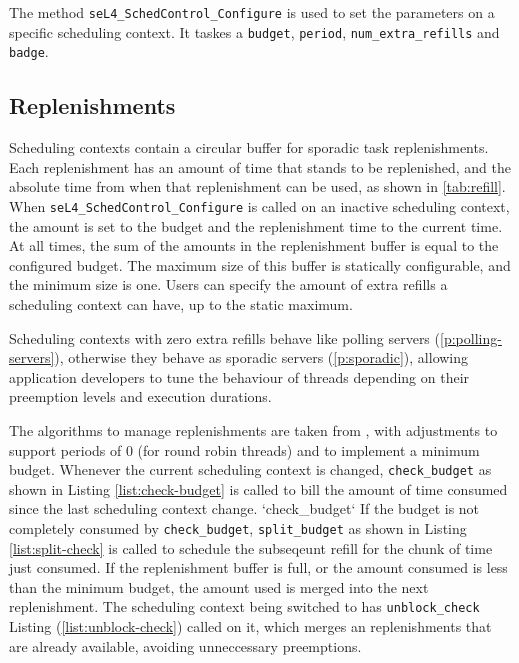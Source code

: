 The method \texttt{seL4\_SchedControl\_Configure} is used to set the parameters on a specific scheduling context.
It taskes a \texttt{budget}, \texttt{period}, \texttt{num\_extra\_refills} and \texttt{badge}.

\subsection{Replenishments}
\label{sec:replenishments}

Scheduling contexts contain a circular buffer for sporadic task replenishments.
Each replenishment has an amount of time that stands to be replenished, and the absolute time from when that replenishment can be used, as shown in \cref{tab:refill}.
When \texttt{seL4\_SchedControl\_Configure} is called on an inactive scheduling context, the amount is set to the budget and the replenishment time to the current time.
At all times, the sum of the amounts in the replenishment buffer is equal to the configured budget.
The maximum size of this buffer is statically configurable, and the minimum size is one.
Users can specify the amount of extra refills a scheduling context can have, up to the static maximum.

Scheduling contexts with zero extra refills behave like polling servers (\cref{p:polling-servers}), otherwise they behave as sporadic servers (\cref{p:sporadic}), allowing application developers to tune the behaviour of threads depending on their preemption levels and execution durations.

The algorithms to manage replenishments are taken from \citet{Danish_LW_11}, with adjustments to support periods of 0 (for round robin threads) and to implement a minimum budget.
Whenever the current scheduling context is changed, \texttt{check\_budget} as shown in Listing \ref{list:check-budget} is called to bill the amount of time consumed since the last scheduling context change.
`check\_budget`
If the budget is not completely consumed by \texttt{check\_budget}, \texttt{split\_budget} as shown in Listing \ref{list:split-check} is called to schedule the subseqeunt refill for the chunk of time just consumed.
If the replenishment buffer is full, or the amount consumed is less than the minimum budget, the amount used is merged into the next replenishment.
The scheduling context being switched to has \texttt{unblock\_check} Listing (\ref{list:unblock-check}) called on it, which merges an replenishments that are already available, avoiding unneccessary preemptions.

